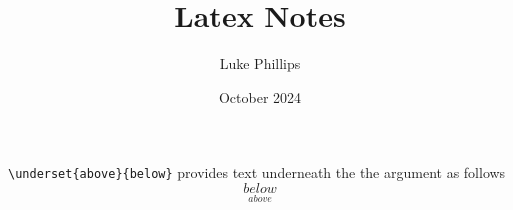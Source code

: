 \documentclass[10pt, a4paper]{article}
\title{Latex Notes}
\author{Luke Phillips}
\date{October 2024}
\begin{document}
\maketitle

\newpage

\verb|\underset{above}{below}| provides text underneath the the argument as follows
\[
\underset{above}{below}
\]
\end{document}
